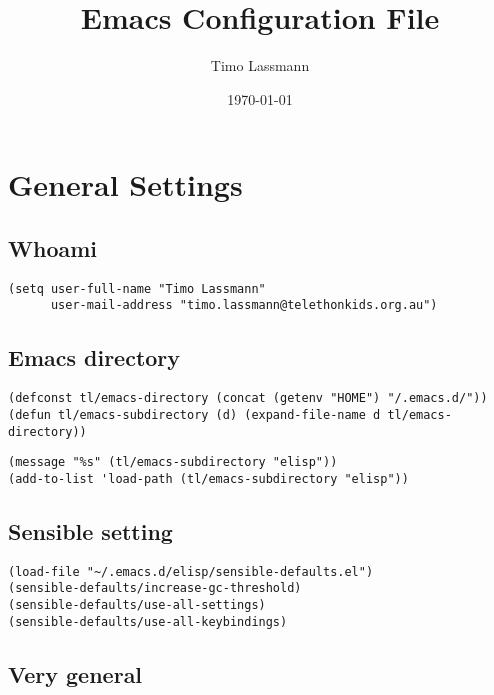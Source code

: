 \documentclass[12pt]{article}
\author{Timo Lassmann}
\date{\today}
\title{Emacs Configuration File}
\begin{document}
\maketitle

\section{General Settings}
\label{sec:org02eedb6}
\subsection{Whoami}
\label{sec:org51da36d}

\lstset{language=Lisp,label= ,caption= ,captionpos=b,numbers=none}
\begin{lstlisting}
(setq user-full-name "Timo Lassmann"
      user-mail-address "timo.lassmann@telethonkids.org.au")
\end{lstlisting}

\subsection{Emacs directory}
\label{sec:orgf2e2c8a}

\lstset{language=Lisp,label= ,caption= ,captionpos=b,numbers=none}
\begin{lstlisting}
(defconst tl/emacs-directory (concat (getenv "HOME") "/.emacs.d/"))
(defun tl/emacs-subdirectory (d) (expand-file-name d tl/emacs-directory))
\end{lstlisting}

\lstset{language=Lisp,label= ,caption= ,captionpos=b,numbers=none}
\begin{lstlisting}
(message "%s" (tl/emacs-subdirectory "elisp"))
(add-to-list 'load-path (tl/emacs-subdirectory "elisp"))
\end{lstlisting}

\subsection{Sensible setting}
\label{sec:orga4fea7a}

\lstset{language=Lisp,label= ,caption= ,captionpos=b,numbers=none}
\begin{lstlisting}
(load-file "~/.emacs.d/elisp/sensible-defaults.el")
(sensible-defaults/increase-gc-threshold)
(sensible-defaults/use-all-settings)
(sensible-defaults/use-all-keybindings)
\end{lstlisting}

\subsection{Very general}
\label{sec:org382f58d}
\end{document}
